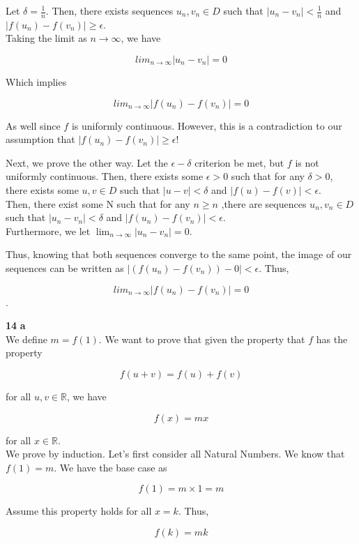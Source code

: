 \documentclass[addpoints]{exam}
\begin{document}
\begin{questions}
Let $\delta = \frac{1}{n}$. Then, there exists sequences $u_n, v_n \in D$ such that $|u_n - v_n| < \frac{1}{n}$
and $|f(u_n) - f(v_n)| \geq \epsilon$.\\

Taking the limit as $n \to \infty$, we have

\[lim_{n \to \infty} |u_n - v_n| = 0\]

Which implies

\[lim_{n \to \infty} |f(u_n) - f(v_n)| = 0\]

As well since $f$ is uniformly continuous. However, this is a contradiction to our assumption that
$|f(u_n) - f(v_n)| \geq \epsilon$! 

Next, we prove the other way. Let the $\epsilon - \delta$ criterion be met, but $f$ is not uniformly continuous. 
Then, there exists some $\epsilon > 0$ such that for any $\delta > 0$, there exists some $u, v \in D$ such that
$|u - v| < \delta$ and $|f(u) - f(v)| < \epsilon$.\\

Then, there exist some N such that for any $n \geq n$ ,there are sequences 
$u_n, v_n \in D$ such that $|u_n - v_n| < \delta$ and $|f(u_n) - f(v_n)| < \epsilon$.\\

Furthermore, we let $\lim_{n \to \infty} |u_n - v_n| = 0$.

Thus, knowing that both sequences converge to the same point, the image of our sequences can be written as
$|(f(u_n) - f(v_n)) - 0| < \epsilon$. Thus, 

\[lim_{n \to \infty} |f(u_n) - f(v_n)| = 0\].

\question \textbf{14} \textbf{a}\\

We define $m = f(1)$. We want to prove that given the property that $f$ has the property 

\[f(u + v) = f(u) + f(v)\]

for all $u, v \in \mathbb{R}$, we have

\[f(x) = mx\]

for all $x \in \mathbb{R}$.\\

We prove by induction. Let's first consider all Natural Numbers. We know that $f(1) = m$. 
We have the base case as

\[f(1) = m \times 1 = m\]

Assume this property holds for all $x = k$. Thus, 

\[f(k) = mk\]


\end{questions}
\end{document}
